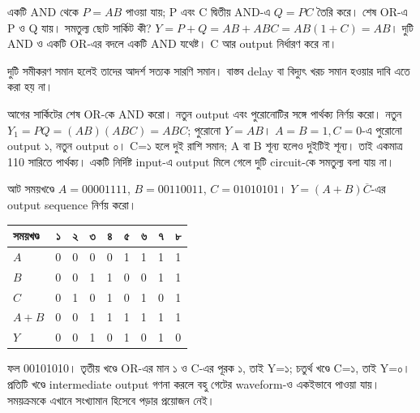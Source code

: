 একটি AND থেকে $P=AB$ পাওয়া যায়; P এবং C দ্বিতীয় AND-এ $Q=PC$ তৈরি করে। শেষ OR-এ P ও Q যায়। সমতুল্য ছোট সার্কিট কী?
\chThreeAnswer $Y=P+Q=AB+ABC=AB(1+C)=AB$। দুটি AND ও একটি OR-এর বদলে একটি AND যথেষ্ট। C আর output নির্ধারণ করে না।
\begin{center}\begin{minipage}{\linewidth}\centering
\begin{chThreeDiagram}\end{chThreeDiagram}
\end{minipage}\end{center}
দুটি সমীকরণ সমান হলেই তাদের আদর্শ সত্যক সারণি সমান। বাস্তব delay বা বিদ্যুৎ খরচ সমান হওয়ার দাবি এতে করা হয় না।

আগের সার্কিটের শেষ OR-কে AND করো। নতুন output এবং পুরোনোটির সঙ্গে পার্থক্য নির্ণয় করো।
\chThreeAnswer নতুন $Y_1=PQ=(AB)(ABC)=ABC$; পুরোনো $Y=AB$। $A=B=1,C=0$-এ পুরোনো output ১, নতুন output ০। C=১ হলে দুই রাশি সমান; A বা B শূন্য হলেও দুইটিই শূন্য। তাই একমাত্র 110 সারিতে পার্থক্য। একটি নির্দিষ্ট input-এ output মিলে গেলে দুটি circuit-কে সমতুল্য বলা যায় না।

আট সময়খণ্ডে $A=00001111$, $B=00110011$, $C=01010101$। $Y=(A+B)\overline C$-এর output sequence নির্ণয় করো।
\chThreeAnswer
\begin{center}\begin{tabular}{|l|c|c|c|c|c|c|c|c|}\hline
সময়খণ্ড&১&২&৩&৪&৫&৬&৭&৮\\\hline
$A$&0&0&0&0&1&1&1&1\\\hline
$B$&0&0&1&1&0&0&1&1\\\hline
$C$&0&1&0&1&0&1&0&1\\\hline
$A+B$&0&0&1&1&1&1&1&1\\\hline
$Y$&0&0&1&0&1&0&1&0\\\hline
\end{tabular}\end{center}
ফল 00101010। তৃতীয় খণ্ডে OR-এর মান ১ ও C-এর পূরক ১, তাই Y=১; চতুর্থ খণ্ডে C=১, তাই Y=০। প্রতিটি খণ্ডে intermediate output গণনা করলে বহু গেটের waveform-ও একইভাবে পাওয়া যায়। সময়ক্রমকে এখানে সংখ্যামান হিসেবে পড়ার প্রয়োজন নেই।


